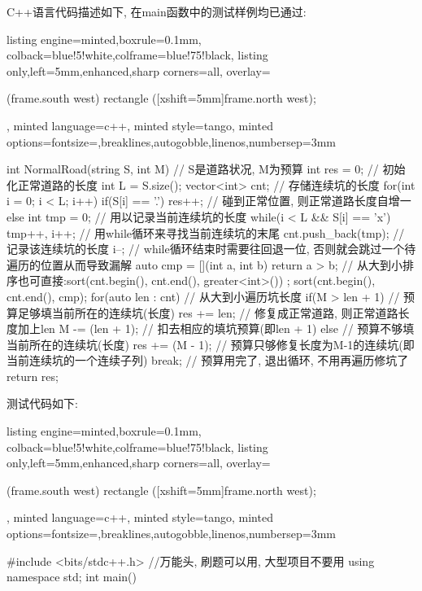 \documentclass{article}
\begin{document}
\begin{homeworkProblem}
    C++语言代码描述如下, 在main函数中的测试样例均已通过:
\begin{tcblisting}{listing engine=minted,boxrule=0.1mm,
colback=blue!5!white,colframe=blue!75!black,
listing only,left=5mm,enhanced,sharp corners=all,
overlay={\begin{tcbclipinterior} (frame.south west)
rectangle ([xshift=5mm]frame.north west);\end{tcbclipinterior}},
minted language=c++,
minted style=tango,
minted options={fontsize=\small,breaklines,autogobble,linenos,numbersep=3mm}}
int NormalRoad(string S, int M) { // S是道路状况, M为预算
    int res = 0; // 初始化正常道路的长度
    int L = S.size();
    vector<int> cnt; // 存储连续坑的长度
    for(int i = 0; i < L; i++) {
        if(S[i] == '.') {
            res++; // 碰到正常位置, 则正常道路长度自增一
        }
        else {
            int tmp = 0; // 用以记录当前连续坑的长度
            while(i < L && S[i] == 'x') {
                tmp++, i++; // 用while循环来寻找当前连续坑的末尾
            }
            cnt.push_back(tmp); // 记录该连续坑的长度
            i--; // while循环结束时需要往回退一位, 否则就会跳过一个待遍历的位置从而导致漏解
        }
    }
    auto cmp = [](int a, int b){
        return a > b; // 从大到小排序也可直接:sort(cnt.begin(), cnt.end(), greater<int>())
    };
    sort(cnt.begin(), cnt.end(), cmp);
    for(auto len : cnt) { // 从大到小遍历坑长度
        if(M > len + 1) { // 预算足够填当前所在的连续坑(长度)
            res += len; // 修复成正常道路, 则正常道路长度加上len
            M -= (len + 1); // 扣去相应的填坑预算(即len + 1)
        }
        else { // 预算不够填当前所在的连续坑(长度)
            res += (M - 1); // 预算只够修复长度为M-1的连续坑(即当前连续坑的一个连续子列)
            break; // 预算用完了, 退出循环, 不用再遍历修坑了
        }
    }
    return res;
}
\end{tcblisting}
    \newpage
    测试代码如下: 
\begin{tcblisting}{listing engine=minted,boxrule=0.1mm,
colback=blue!5!white,colframe=blue!75!black,
listing only,left=5mm,enhanced,sharp corners=all,
overlay={\begin{tcbclipinterior} (frame.south west)
rectangle ([xshift=5mm]frame.north west);\end{tcbclipinterior}},
minted language=c++,
minted style=tango,
minted options={fontsize=\small,breaklines,autogobble,linenos,numbersep=3mm}}
#include <bits/stdc++.h> //万能头, 刷题可以用, 大型项目不要用
using namespace std;
int main() {
}
\end{tcblisting}
\end{homeworkProblem}
\end{document}
